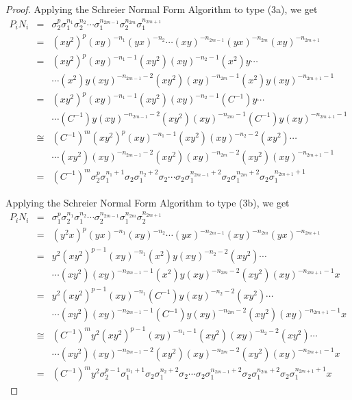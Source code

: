 \documentclass{article}
\begin{document}
\begin{proof}
\noindent Applying the Schreier Normal Form Algorithm to type (3a), we get 
\begin{eqnarray*}
P_{i}N_{i} & = & \sigma_{2}^{p}\sigma_{1}^{n_{1}}\sigma_{2}^{n_{2}}\cdots\sigma_{1}^{n_{2m-1}}\sigma_{2}^{n_{2m}}\sigma_{1}^{n_{2m+1}}\\
\ & = & (xy^{2})^{p}(xy)^{-n_{1}}(yx)^{-n_{2}} \cdots (xy)^{-n_{2m-1}}(yx)^{-n_{2m}}(xy)^{-n_{2m+1}}\\
\ & = & (xy^{2})^{p}(xy)^{-n_{1}-1}(xy^{2})(xy)^{-n_{2}-1}(x^{2})y \cdots\\
\ & \ & \cdots(x^{2})y(xy)^{-n_{2m-1}-2}(xy^{2})(xy)^{-n_{2m}-1}(x^{2})y(xy)^{-n_{2m+1}-1}\\
\ & = & (xy^{2})^{p}(xy)^{-n_{1}-1}(xy^{2})(xy)^{-n_{2}-1}(C^{-1})y \cdots\\
\ & \ & \cdots(C^{-1})y(xy)^{-n_{2m-1}-2}(xy^{2})(xy)^{-n_{2m}-1}(C^{-1})y(xy)^{-n_{2m+1}-1}\\
\ & \cong & (C^{-1})^{m}(xy^{2})^{p}(xy)^{-n_{1}-1}(xy^{2})(xy)^{-n_{2}-2}(xy^{2}) \cdots\\
\ & \ & \cdots(xy^{2})(xy)^{-n_{2m-1}-2}(xy^{2})(xy)^{-n_{2m}-2}(xy^{2})(xy)^{-n_{2m+1}-1}\\
\ & = & (C^{-1})^{m}\sigma_{2}^{p}\sigma_{1}^{n_{1}+1}\sigma_{2}\sigma_{1}^{n_{2}+2}\sigma_{2} \cdots \sigma_{2}\sigma_{1}^{n_{2m-1}+2}\sigma_{2}\sigma_{1}^{n_{2m}+2}\sigma_{2}\sigma_{1}^{n_{2m+1}+1}
\end{eqnarray*}

\noindent Applying the Schreier Normal Form Algorithm to type (3b), we get 
\begin{eqnarray*}
P_{i}N_{i} & = & \sigma_{1}^{p}\sigma_{2}^{n_{1}}\sigma_{1}^{n_{2}}\cdots\sigma_{2}^{n_{2m-1}}\sigma_{1}^{n_{2m}}\sigma_{2}^{n_{2m+1}}\\
\ & = & (y^{2}x)^{p}(yx)^{-n_{1}}(xy)^{-n_{2}} \cdots (yx)^{-n_{2m-1}}(xy)^{-n_{2m}}(yx)^{-n_{2m+1}}\\
\ & = & y^{2}(xy^{2})^{p-1}(xy)^{-n_{1}}(x^{2})y(xy)^{-n_{2}-2}(xy^{2}) \cdots\\
\ & \ & \cdots(xy^{2})(xy)^{-n_{2m-1}-1}(x^{2})y(xy)^{-n_{2m}-2}(xy^{2})(xy)^{-n_{2m+1}-1}x\\
\ & = & y^{2}(xy^{2})^{p-1}(xy)^{-n_{1}}(C^{-1})y(xy)^{-n_{2}-2}(xy^{2}) \cdots\\
\ & \ & \cdots(xy^{2})(xy)^{-n_{2m-1}-1}(C^{-1})y(xy)^{-n_{2m}-2}(xy^{2})(xy)^{-n_{2m+1}-1}x\\
\ & \cong & (C^{-1})^{m}y^{2}(xy^{2})^{p-1}(xy)^{-n_{1}-1}(xy^{2})(xy)^{-n_{2}-2}(xy^{2}) \cdots\\
\ & \ & \cdots(xy^{2})(xy)^{-n_{2m-1}-2}(xy^{2})(xy)^{-n_{2m}-2}(xy^{2})(xy)^{-n_{2m+1}-1}x\\
\ & = & (C^{-1})^{m}y^{2}\sigma_{2}^{p-1}\sigma_{1}^{n_{1}+1}\sigma_{2}\sigma_{1}^{n_{2}+2}\sigma_{2} \cdots \sigma_{2}\sigma_{1}^{n_{2m-1}+2}\sigma_{2}\sigma_{1}^{n_{2m}+2}\sigma_{2}\sigma_{1}^{n_{2m+1}+1}x
\end{eqnarray*}


\end{proof}
\end{document}
